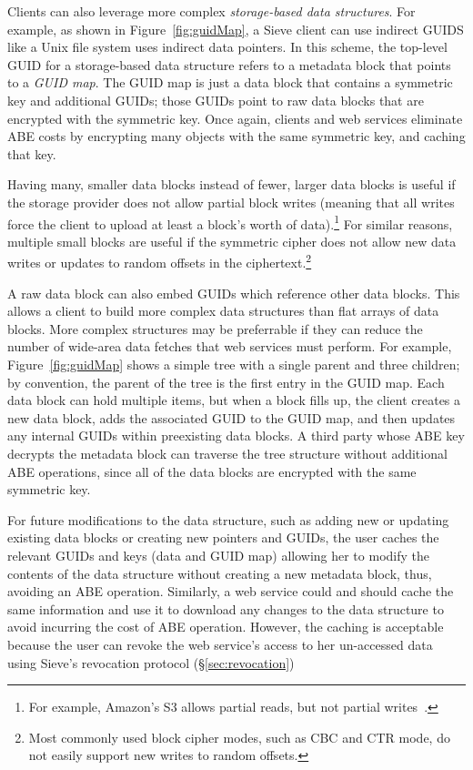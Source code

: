 Clients can also leverage more complex \emph{storage-based
data structures}. For example, as shown in
Figure~\ref{fig:guidMap}, a Sieve client can
use indirect GUIDS like a Unix file system uses
indirect data pointers. In this scheme, the
top-level GUID for a storage-based data
structure refers to a metadata block that
points to a \emph{GUID map}. The GUID map
is just a data block that contains a symmetric
key and additional GUIDs; those GUIDs point to
raw data blocks that are encrypted with the
symmetric key. Once again, clients and web
services eliminate ABE costs by encrypting
many objects with the same symmetric key,
and caching that key.

Having many, smaller data blocks instead of
fewer, larger data blocks is useful if the
storage provider does not allow partial block
writes (meaning that all writes force the
client to upload at least a block's worth of
data).\footnote{For example, Amazon's S3
allows partial reads, but not partial writes~\cite{AmazonPUT}.} %
For similar reasons, multiple small blocks
are useful if the symmetric cipher does
not allow new data writes or 
updates to random offsets in the
ciphertext.\footnote{Most commonly used 
block cipher modes, such as CBC and CTR mode,
do not easily support new writes to random offsets.}

A raw data block can also embed GUIDs which
reference other data blocks. This allows
a client to build more complex data structures
than flat arrays of data blocks.
More complex structures may be preferrable
if they can reduce the number of wide-area
data fetches that web services must perform.
For example, Figure~\ref{fig:guidMap} shows
a simple tree with a single parent and three
children; by convention, the parent of the
tree is the first entry in the GUID map. Each
data block can hold multiple items, but when
a block fills up, the client creates a new
data block, adds the associated GUID to
the GUID map, and then updates any internal
GUIDs within preexisting data blocks. A third
party whose ABE key decrypts the metadata block
can traverse the tree structure without
additional ABE operations, since all of the
data blocks are encrypted with the same
symmetric key. 

For future modifications to the data structure,
such as adding new or updating existing data
blocks or creating new pointers and GUIDs,
the user caches the relevant GUIDs and keys
(data and GUID map) allowing her to modify
the contents of the data structure without
creating a new metadata block, thus,
avoiding an ABE operation. Similarly, a web
service could and should cache the same information
and use it to download any changes to the data 
structure to avoid incurring the cost of ABE 
operation. However, the caching is acceptable
because the user can revoke the web service's
access to her un-accessed data using Sieve's
revocation protocol (\S\ref{sec:revocation})

